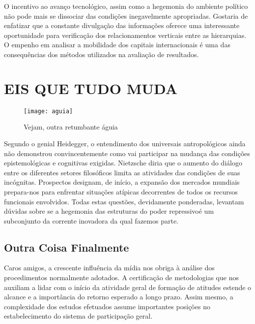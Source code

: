 \documentclass[chapter=TITLE,section=Title,espaco=duplo,tocpage=plain,appendix=Name,floatnumber=continuous]{abnt}
\begin{document}
O incentivo ao avanço tecnológico, assim como a hegemonia do ambiente político
não pode mais se dissociar das condições inegavelmente apropriadas. Gostaria de
enfatizar que a constante divulgação das informações oferece uma interessante
oportunidade para verificação dos relacionamentos verticais entre as
hierarquias. O empenho em analisar a mobilidade dos capitais internacionais é
uma das consequências dos métodos utilizados na avaliação de resultados.

\chapter{EIS QUE TUDO MUDA}

\begin{figure}[h!]
  \centering
  \texttt{[image: aguia]}
  \caption{Vejam, outra retumbante águia}
\end{figure}

Segundo o genial Heidegger, o entendimento dos universais antropológicos ainda
não demonstrou convincentemente como vai participar na mudança das condições
epistemológicas e cognitivas exigidas. Nietzsche diria que o aumento do diálogo
entre os diferentes setores filosóficos limita as atividades das condições de
suas incógnitas. Prospectos designam, de início, a expansão dos mercados
mundiais prepara-nos para enfrentar situações atípicas decorrentes de todos os
recursos funcionais envolvidos. Todas estas questões, devidamente ponderadas,
levantam dúvidas sobre se a hegemonia das estruturas do poder repressivoé um
subconjunto da corrente inovadora da qual fazemos parte.

\section{Outra Coisa Finalmente}

Caros amigos, a crescente influência da mídia nos obriga à análise dos
procedimentos normalmente adotados. A certificação de metodologias que nos
auxiliam a lidar com o início da atividade geral de formação de atitudes
estende o alcance e a importância do retorno esperado a longo prazo. Assim
mesmo, a complexidade dos estudos efetuados assume importantes posições no
estabelecimento do sistema de participação geral.


\end{document}
